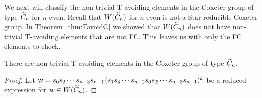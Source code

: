 We next will classify the non-trivial T-avoiding elements in the Coxeter group of type $\widetilde{C}_n$ for $n$ even. Recall that $W(\widetilde{C}_n)$ for $n$ even is not a Star reducible Coxeter group. In Theorem~\ref{thm:TavoidC} we showed that $W(\widetilde{C}_n)$ does not have non-trivial T-avoiding elements that are not FC. This leaves us with only the FC elements to check.

\begin{theorem}
	There are non-trivial T-avoiding elements in the Coxeter group of type $\widetilde{C}_n$.
	\begin{proof}
		Let $\mathsf{w}=s_0s_2 \cdots s_{n-3}s_{n-1}(s_1s_3\cdots s_{n-2}s_0s_2\cdots s_{n-3}s_{n-1})^k$ be a reduced expression for $w \in W(\widetilde{C}_n)$.
	\end{proof}
\end{theorem}
